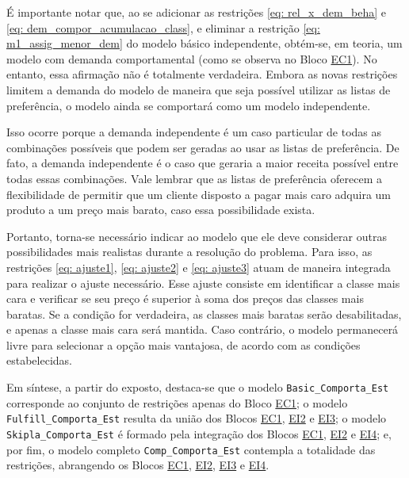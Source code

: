É importante notar que, ao se adicionar as restrições \eqref{eq: rel_x_dem_beha} e \eqref{eq: dem_compor_acumulacao_class}, e eliminar a restrição \eqref{eq: m1_assig_menor_dem} do modelo básico independente, obtém-se, em teoria, um modelo com demanda comportamental (como se observa no Bloco \hyperlink{frase:EC1}{EC1}). No entanto, essa afirmação não é totalmente verdadeira. Embora as novas restrições limitem a demanda do modelo de maneira que seja possível utilizar as listas de preferência, o modelo ainda se comportará como um modelo independente.

Isso ocorre porque a demanda independente é um caso particular de todas as combinações possíveis que podem ser geradas ao usar as listas de preferência. De fato, a demanda independente é o caso que geraria a maior receita possível entre todas essas combinações. Vale lembrar que as listas de preferência oferecem a flexibilidade de permitir que um cliente disposto a pagar mais caro adquira um produto a um preço mais barato, caso essa possibilidade exista.

Portanto, torna-se necessário indicar ao modelo que ele deve considerar outras possibilidades mais realistas durante a resolução do problema. Para isso, as restrições  \eqref{eq: ajuste1},  \eqref{eq: ajuste2} e  \eqref{eq: ajuste3} atuam de maneira integrada para realizar o ajuste necessário. Esse ajuste consiste em identificar a classe mais cara e verificar se seu preço é superior à soma dos preços das classes mais baratas. Se a condição for verdadeira, as classes mais baratas serão desabilitadas, e apenas a classe mais cara será mantida. Caso contrário, o modelo permanecerá livre para selecionar a opção mais vantajosa, de acordo com as condições estabelecidas.

Em síntese, a partir do exposto, destaca-se que o modelo \texttt{Basic\_Comporta\_Est} corresponde ao conjunto de restrições apenas do Bloco \hyperlink{frase:EC1}{EC1}; o modelo \texttt{Fulfill\_Comporta\_Est} resulta da união dos Blocos \hyperlink{frase:EC1}{EC1}, \hyperlink{frase:EI2.1}{EI2} e \hyperlink{frase:EI3.1}{EI3}; o modelo \texttt{Skipla\_Comporta\_Est} é formado pela integração dos Blocos \hyperlink{frase:EC1}{EC1}, \hyperlink{frase:EI2.1}{EI2} e \hyperlink{frase:EI4.1}{EI4}; e, por fim, o modelo completo \texttt{Comp\_Comporta\_Est} contempla a totalidade das restrições, abrangendo os Blocos \hyperlink{frase:EC1}{EC1}, \hyperlink{frase:EI2.1}{EI2}, \hyperlink{frase:EI3.1}{EI3} e \hyperlink{frase:EI4.1}{EI4}.


